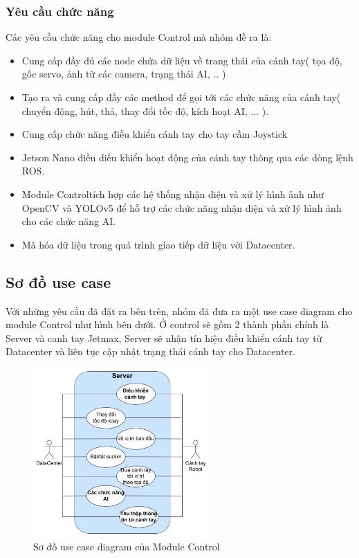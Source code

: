 \subsubsection{Yêu cầu chức năng}
Các yêu cầu chức năng cho module Control mà nhóm đề ra là:
\begin{itemize}
    \item Cung cấp đầy đủ các node chứa dữ liệu về trang thái của cánh tay( tọa độ, gốc servo, ảnh từ các camera, trạng thái AI, .. )
    \item Tạo ra và cung cấp đầy các method để gọi tới các chức năng của cánh tay( chuyển động, hút, thả, thay đổi tốc độ, kích hoạt AI, ... ).
    \item Cung cấp chức năng điều khiển cánh tay cho tay cầm Joystick
    \item Jetson Nano điều diều khiển hoạt động của cánh tay thông qua các dòng lệnh ROS.
    \item  Module Controltích hợp các hệ thống nhận diện và xử lý hình ảnh như OpenCV và YOLOv5 để hỗ trợ các chức năng nhận diện và xử lý hình ảnh cho các chức năng AI.
    \item Mã hóa dữ liệu trong quá trình giao tiếp dữ liệu với Datacenter.
\end{itemize}
\subsection{Sơ đồ use case}
Với những yêu cầu đã đặt ra bên trên, nhóm đã đưa ra một use case diagram cho module Control như hình bên dưới. Ở control sẽ gồm 2 thành phần chính là Server và canh tay Jetmax, Server sẽ nhận tín hiệu điều khiển cánh tay từ Datacenter và liên tục cập nhật trạng thái cánh tay cho Datacenter.
\begin{figure}[!h]
    \centering
    \includegraphics[width=0.6\textwidth]{Images/Implementation/Control/Control-usecase.jpg}
    \caption{Sơ đồ use case diagram của Module Control}
\end{figure}
